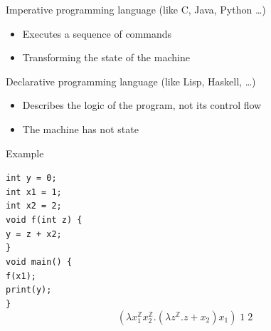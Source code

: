 \documentclass{beamer}
\begin{document}
\begin{frame}{\subDec}
	Imperative programming language (like C, Java, Python \dots)
	\begin{itemize}
		\pause
		\item Executes a sequence of commands
		\pause
		\item Transforming the state of the machine
	\end{itemize}
	
	\pause
	Declarative programming language (like Lisp, Haskell, \dots)
	\begin{itemize}
		\pause
		\item Describes the logic of the program, not its control flow
		\pause
		\item The machine has not state
	\end{itemize}
\end{frame}

\begin{frame}{\subDec}
	\begin{exampleblock}{Example}
		\vspace{-1ex}
		\begin{multicols}{2}
			\texttt{int y = 0;}\\
			\texttt{int x1 = 1;}\\
			\texttt{int x2 = 2;}\\
			\texttt{void f(int z) \{}\\
				\quad \texttt{y = z + x2;}\\
			\texttt{\}}\\
			\texttt{void main() \{}\\
				\quad \texttt{f(x1);}\\
				\quad \texttt{print(y);}\\
			\texttt{\}}
			\columnbreak
			\vfill
			\[ (\lambda x_1^\mathbb{Z} x_2^\mathbb{Z}. (\lambda z^\mathbb{Z}. z + x_2) x_1) \; 1 \; 2 \]
		\end{multicols}
	\end{exampleblock}
\end{frame}
\end{document}
